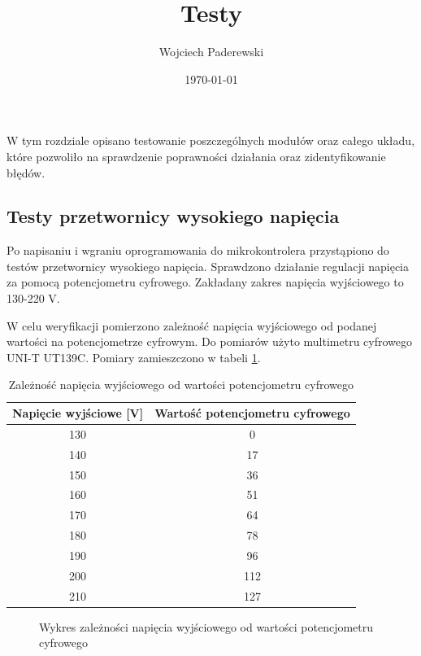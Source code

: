 \documentclass[../main.tex]{subfiles}
\author{Wojciech Paderewski}
\date{\today}
\title{Testy}
\begin{document}
W tym rozdziale opisano testowanie poszczególnych 
modułów oraz całego układu, które pozwoliło na sprawdzenie poprawności działania oraz zidentyfikowanie błędów.

\subsection{Testy przetwornicy wysokiego napięcia}
Po napisaniu i wgraniu oprogramowania do mikrokontrolera przystąpiono do testów przetwornicy wysokiego napięcia.
Sprawdzono działanie regulacji napięcia za pomocą potencjometru cyfrowego. Zakładany zakres napięcia wyjściowego to 130-220 V.

W celu weryfikacji pomierzono zależność napięcia wyjściowego od podanej wartości na potencjometrze cyfrowym.
Do pomiarów użyto multimetru cyfrowego UNI-T UT139C. Pomiary zamieszczono w tabeli \ref{tab:voltage}.

\begin{table}[H]
    \centering
    \begin{tabular}{|c|c|}
        \hline
        Napięcie wyjściowe [V] & Wartość potencjometru cyfrowego \\
        \hline
        130 & 0 \\
        140 & 17 \\
        150 & 36 \\
        160 & 51 \\
        170 & 64 \\
        180 & 78 \\
        190 & 96 \\
        200 & 112 \\
        210 & 127 \\
        \hline
    \end{tabular}
    \caption{Zależność napięcia wyjściowego od wartości potencjometru cyfrowego}
    \label{tab:voltage}
\end{table}

\begin{figure}[H]
  \centering
  \caption{Wykres zależności napięcia wyjściowego od wartości potencjometru cyfrowego}
\end{figure}
\end{document}
